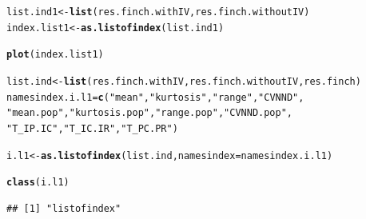 \documentclass[12pt]{article}\usepackage[]{graphicx}\usepackage[]{color}
\makeatletter
\newcommand{\hlstr}[1]{\textcolor[rgb]{0.192,0.494,0.8}{#1}}%
\newcommand{\hlstd}[1]{\textcolor[rgb]{0.345,0.345,0.345}{#1}}%
\newcommand{\hlkwb}[1]{\textcolor[rgb]{0.69,0.353,0.396}{#1}}%
\newcommand{\hlkwc}[1]{\textcolor[rgb]{0.333,0.667,0.333}{#1}}%
\newcommand{\hlkwd}[1]{\textcolor[rgb]{0.737,0.353,0.396}{\textbf{#1}}}%
\newenvironment{kframe}{%
 \def\at@end@of@kframe{}%
 \ifinner\ifhmode%
  \def\at@end@of@kframe{\end{minipage}}%
  \begin{minipage}{\columnwidth}%
 \fi\fi%
 \def\FrameCommand##1{\hskip\@totalleftmargin \hskip-\fboxsep
 \colorbox{shadecolor}{##1}\hskip-\fboxsep
     \hskip-\linewidth \hskip-\@totalleftmargin \hskip\columnwidth}%
 \MakeFramed {\advance\hsize-\width
   \@totalleftmargin\z@ \linewidth\hsize
   \@setminipage}}%
 {\par\unskip\endMakeFramed%
 \at@end@of@kframe}
\newenvironment{knitrout}{}{} %
\makeatother
\begin{document}
\begin{knitrout}
\color{fgcolor}\begin{kframe}
\begin{alltt}
\hlstd{list.ind1}\hlkwb{<-}\hlkwd{list}\hlstd{(res.finch.withIV, res.finch.withoutIV)}
\hlstd{index.list1}\hlkwb{<-}\hlkwd{as.listofindex}\hlstd{(list.ind1)}

\hlkwd{plot}\hlstd{(index.list1)}
\end{alltt}
\end{kframe}
\end{knitrout}

\begin{knitrout}
\color{fgcolor}\begin{kframe}
\begin{alltt}
\hlstd{list.ind}\hlkwb{<-}\hlkwd{list}\hlstd{(res.finch.withIV, res.finch.withoutIV, res.finch)}
\hlstd{namesindex.i.l1} \hlkwb{=} \hlkwd{c}\hlstd{(}\hlstr{"mean"}\hlstd{,} \hlstr{"kurtosis"}\hlstd{,} \hlstr{"range"}\hlstd{,} \hlstr{"CVNND"}\hlstd{,}
         \hlstr{"mean.pop"}\hlstd{,} \hlstr{"kurtosis.pop"}\hlstd{,} \hlstr{"range.pop"}\hlstd{,} \hlstr{"CVNND.pop"}\hlstd{,}
         \hlstr{"T_IP.IC"}\hlstd{,} \hlstr{"T_IC.IR"}\hlstd{,} \hlstr{"T_PC.PR"}\hlstd{)}

\hlstd{i.l1}\hlkwb{<-}\hlkwd{as.listofindex}\hlstd{(list.ind,} \hlkwc{namesindex} \hlstd{= namesindex.i.l1)}

\hlkwd{class}\hlstd{(i.l1)}
\end{alltt}
\begin{verbatim}
## [1] "listofindex"
\end{verbatim}
\end{kframe}
\end{knitrout}
\end{document}
